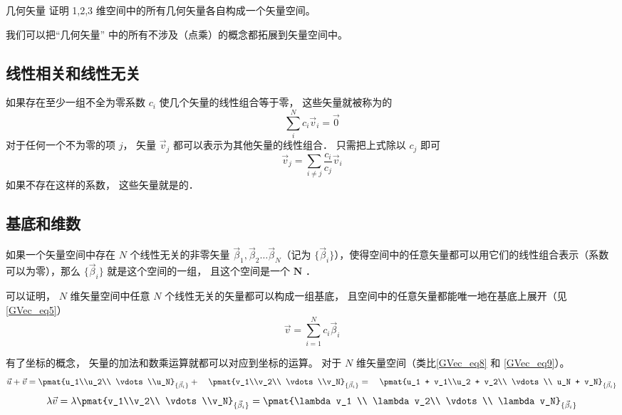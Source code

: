 \begin{exer}{几何矢量}
证明 1,2,3 维空间中的所有几何矢量各自构成一个矢量空间。
\end{exer}

我们可以把“几何矢量” 中的所有不涉及（点乘）的概念都拓展到矢量空间中。

\subsection{线性相关和线性无关}
如果存在至少一组不全为零系数 $c_i$ 使几个矢量的线性组合等于零， 这些矢量就被称为的
\begin{equation}
\sum_i^N c_i \vec v_i = \vec 0
\end{equation}
对于任何一个不为零的项 $j$， 矢量 $\vec v_j$ 都可以表示为其他矢量的线性组合． 只需把上式除以 $c_j$ 即可
\begin{equation}
\vec v_j = \sum_{i \ne j}\frac{c_i}{c_j} \vec v_i
\end{equation}
如果不存在这样的系数， 这些矢量就是的． 

\subsection{基底和维数}
如果一个矢量空间中存在 $N$ 个线性无关的非零矢量 $\vec \beta_1, \vec \beta_2 \dots \vec \beta_N$（记为 $\{\vec \beta_i\}$），使得空间中的任意矢量都可以用它们的线性组合表示（系数可以为零），那么 $\{\vec \beta_i\}$ 就是这个空间的一组， 且这个空间是一个 $\boldsymbol{N}$ ．

可以证明， $N$ 维矢量空间中任意 $N$ 个线性无关的矢量都可以构成一组基底， 且空间中的任意矢量都能唯一地在基底上展开（见\autoref{GVec_eq5}）
\begin{equation}
\vec v = \sum_{i=1}^N c_i \vec \beta_i
\end{equation}

有了坐标的概念， 矢量的加法和数乘运算就都可以对应到坐标的运算。 对于 $N$ 维矢量空间（类比\autoref{GVec_eq8} 和 \autoref{GVec_eq9}）。
\begin{equation}
\vec u + \vec v = \pmat{u_1\\u_2\\ \vdots\\u_N}_{\{\vec\beta_i\}} + \quad \pmat{v_1\\v_2\\ \vdots \\v_N}_{\{\vec\beta_i\}} = \quad \pmat{u_1 + v_1\\u_2 + v_2\\ \vdots \\ u_N + v_N}_{\{\vec\beta_i\}}
\end{equation}
\begin{equation}
\lambda \vec v = \lambda\pmat{v_1\\v_2\\ \vdots \\v_N}_{\{\vec\beta_i\}} = \pmat{\lambda v_1 \\ \lambda v_2\\ \vdots \\ \lambda v_N}_{\{\vec\beta_i\}}
\end{equation}

